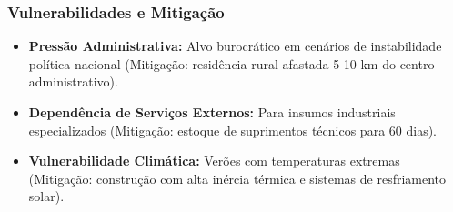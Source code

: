 \subsubsection{Vulnerabilidades e
Mitigação}

\begin{itemize}
\tightlist
\item
  \textbf{Pressão Administrativa:} Alvo burocrático em cenários de
  instabilidade política nacional (Mitigação: residência rural afastada
  5-10 km do centro administrativo).
\item
  \textbf{Dependência de Serviços Externos:} Para insumos industriais
  especializados (Mitigação: estoque de suprimentos técnicos para 60
  dias).
\item
  \textbf{Vulnerabilidade Climática:} Verões com temperaturas extremas
  (Mitigação: construção com alta inércia térmica e sistemas de
  resfriamento solar).
\end{itemize}

